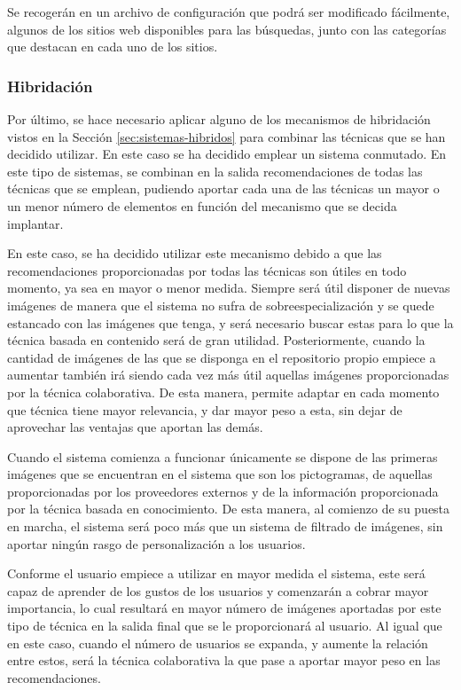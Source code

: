 Se recogerán en un archivo de configuración que podrá ser modificado fácilmente, algunos de los sitios web disponibles para las búsquedas, junto con las categorías que destacan en cada uno de los sitios.


\subsubsection{Hibridación}


Por último, se hace necesario aplicar alguno de los mecanismos de hibridación vistos en la Sección \ref{sec:sistemas-hibridos} para combinar las técnicas que se han decidido utilizar. En este caso se ha decidido emplear un sistema conmutado. En este tipo de sistemas, se combinan en la salida recomendaciones de todas las técnicas que se emplean, pudiendo aportar cada una de las técnicas un mayor o un menor número de elementos en función del mecanismo que se decida implantar.

En este caso, se ha decidido utilizar este mecanismo debido a que las recomendaciones proporcionadas por todas las técnicas son útiles en todo momento, ya sea en mayor o menor medida. Siempre será útil disponer de nuevas imágenes de manera que el sistema no sufra de sobreespecialización y se quede estancado con las imágenes que tenga, y será necesario buscar estas para lo que la técnica basada en contenido será de gran utilidad. Posteriormente, cuando la cantidad de imágenes de las que se disponga en el repositorio propio empiece a aumentar también irá siendo cada vez más útil aquellas imágenes proporcionadas por la técnica colaborativa. De esta manera, permite adaptar en cada momento que técnica tiene mayor relevancia, y dar mayor peso a esta, sin dejar de aprovechar las ventajas que aportan las demás. 

Cuando el sistema comienza a funcionar únicamente se dispone de las primeras imágenes que se encuentran en el sistema que son los pictogramas, de aquellas proporcionadas por los proveedores externos y de la información proporcionada por la técnica basada en conocimiento. De esta manera, al comienzo de su puesta en marcha, el sistema será poco más que un sistema de filtrado de imágenes, sin aportar ningún rasgo de personalización a los usuarios.

Conforme el usuario empiece a utilizar en mayor medida el sistema, este será capaz de aprender de los gustos de los usuarios y comenzarán a cobrar mayor importancia, lo cual resultará en mayor número de imágenes aportadas por este tipo de técnica en la salida final que se le proporcionará al usuario. Al igual que en este caso, cuando el número de usuarios se expanda, y aumente la relación entre estos, será la técnica colaborativa la que pase a aportar mayor peso en las recomendaciones.



